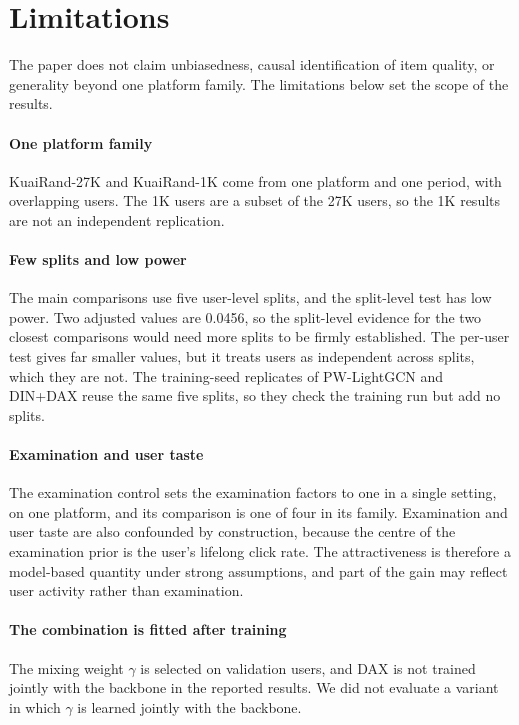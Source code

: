 \section{Limitations}
\label{sec:limits}

The paper does not claim unbiasedness, causal identification of item quality, or generality beyond one platform family. The limitations
below set the scope of the results.

\paragraph{One platform family} KuaiRand-27K and KuaiRand-1K come from one platform and one period, with overlapping users. The 1K users are a
subset of the 27K users, so the 1K results are not an independent replication.

\paragraph{Few splits and low power} The main comparisons use five user-level splits, and the split-level test has low power. Two adjusted values are 0.0456, so the split-level evidence for the two closest comparisons would need more splits to be firmly established. The per-user test gives far smaller values, but it treats users
as independent across splits, which they are not. The training-seed replicates of PW-LightGCN and DIN+DAX reuse the same five splits, so they check the training run but add no splits.

\paragraph{Examination and user taste} The examination control sets the examination factors to one in a single setting, on one platform,
and its comparison is one of four in its family. Examination and user taste are also confounded by construction, because the centre of
the examination prior is the user's lifelong click rate. The attractiveness is therefore a model-based quantity under strong assumptions,
and part of the gain may reflect user activity rather than examination.

\paragraph{The combination is fitted after training} The mixing weight $\gamma$ is selected on validation users, and DAX is not trained jointly with
the backbone in the reported results. We did not evaluate a variant in which $\gamma$ is learned jointly with the backbone.

